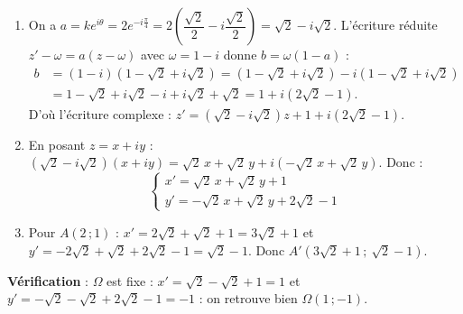 \documentclass[11pt]{article}
\begin{document}
\begin{corrige}
\begin{enumerate}
\item On a $a = k e^{i\theta} = 2e^{-i\frac{\pi}{4}} = 2\left(\dfrac{\sqrt{2}}{2} - i\dfrac{\sqrt{2}}{2}\right) = \sqrt{2} - i\sqrt{2}$. L'écriture réduite $z' - \omega = a(z - \omega)$ avec $\omega = 1 - i$ donne $b = \omega(1 - a)$ :
\begin{align*}
b &= (1 - i)\left(1 - \sqrt{2} + i\sqrt{2}\right) = \left(1 - \sqrt{2} + i\sqrt{2}\right) - i\left(1 - \sqrt{2} + i\sqrt{2}\right) \\
&= 1 - \sqrt{2} + i\sqrt{2} - i + i\sqrt{2} + \sqrt{2} = 1 + i\left(2\sqrt{2} - 1\right).
\end{align*}
D'où l'écriture complexe : $z' = \left(\sqrt{2} - i\sqrt{2}\right)z + 1 + i\left(2\sqrt{2} - 1\right)$.
\item En posant $z = x + iy$ : $(\sqrt{2} - i\sqrt{2})(x + iy) = \sqrt{2}\,x + \sqrt{2}\,y + i\left(-\sqrt{2}\,x + \sqrt{2}\,y\right)$. Donc :
\[ \begin{cases} x' = \sqrt{2}\,x + \sqrt{2}\,y + 1 \\ y' = -\sqrt{2}\,x + \sqrt{2}\,y + 2\sqrt{2} - 1 \end{cases} \]
\item Pour $A(2\,;1)$ : $x' = 2\sqrt{2} + \sqrt{2} + 1 = 3\sqrt{2} + 1$ et $y' = -2\sqrt{2} + \sqrt{2} + 2\sqrt{2} - 1 = \sqrt{2} - 1$. Donc $A'\left(3\sqrt{2} + 1\,;\ \sqrt{2} - 1\right)$.
\end{enumerate}
\textbf{Vérification} : $\Omega$ est fixe : $x' = \sqrt{2} - \sqrt{2} + 1 = 1$ et $y' = -\sqrt{2} - \sqrt{2} + 2\sqrt{2} - 1 = -1$ : on retrouve bien $\Omega(1\,;-1)$.
\end{corrige}
\end{document}
